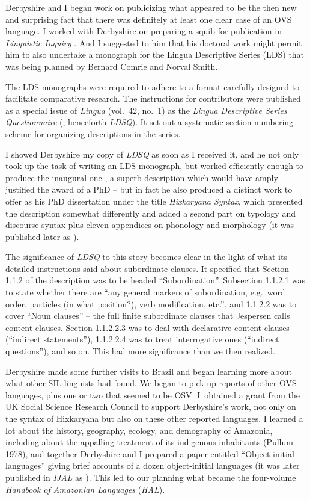 \documentclass[output=paper,colorlinks,citecolor=brown
]{langscibook}
\begin{document}
Derbyshire and I began work on publicizing what appeared to be the then
new and surprising fact that there was definitely at least one clear
case of an OVS language. I worked with Derbyshire on preparing a squib
for publication in \textit{Linguistic Inquiry} \citep{Derbyshire77}.
And I suggested to him that his doctoral work might permit him to
also undertake a monograph for the Lingua Descriptive Series (LDS)
that was being planned by Bernard Comrie and Norval Smith.

The LDS monographs were required to adhere to a format carefully designed
to facilitate comparative research. The instructions for contributors
were published as a special issue of \textit{Lingua} (vol.~42, no.~1)
as the \textit{Lingua Descriptive Series Questionnaire}
(\citealt{ComrSmit77}, henceforth \textit{LDSQ}). It set out a systematic
section-numbering scheme for organizing descriptions in the series.

I showed Derbyshire my copy of \textit{LDSQ} as soon as I received it, and
he not only took up the task of writing an LDS monograph, but worked
efficiently enough to produce the inaugural one \citep{Derbyshire79},
a superb description which would have amply justified the award of a
PhD -- but in fact he also produced a distinct work to offer as his
PhD dissertation under the title \textit{Hixkaryana Syntax}, which
presented the description somewhat differently and added a second
part on typology and discourse syntax plus eleven appendices on
phonology and morphology (it was published later as
\citealt{Derbyshire85}).

The significance of \textit{LDSQ} to this story becomes clear in
the light of what its detailed instructions said about subordinate
clauses. It specified that Section 1.1.2 of the description was to
be headed ``Subordination''. Subsection 1.1.2.1 was to state whether
there are ``any general markers of subordination, e.g.\ word order,
particles (in what position?), verb modification, etc.'', and 1.1.2.2
was to cover ``Noun clauses'' -- the full finite subordinate clauses
that Jespersen calls content clauses. Section 1.1.2.2.3 was to deal
with declarative content clauses (``indirect statements''), 1.1.2.2.4
was to treat interrogative ones (``indirect questions''), and so on.
This had more significance than we then realized.

Derbyshire made some further visits to Brazil and began learning more about
what other SIL linguists had found. We began to pick up reports of
other OVS languages, plus one or two that seemed to be OSV. I~obtained
a grant from the UK Social Science Research Council to support Derbyshire's
work, not only on the syntax of Hixkaryana but also on these other
reported languages. I learned a lot about the history, geography,
ecology, and demography of Amazonia, including about the appalling
treatment of its indigenous inhabitants (Pullum 1978), and together
Derbyshire and I prepared a paper entitled ``Object initial languages'' giving
brief accounts of a dozen object-initial languages (it was later
published in \textit{IJAL} as \citealt{DerbPull81}). This led to our
planning what became the four-volume \textit{Handbook of Amazonian
Languages} (\textit{HAL}).
\end{document}
